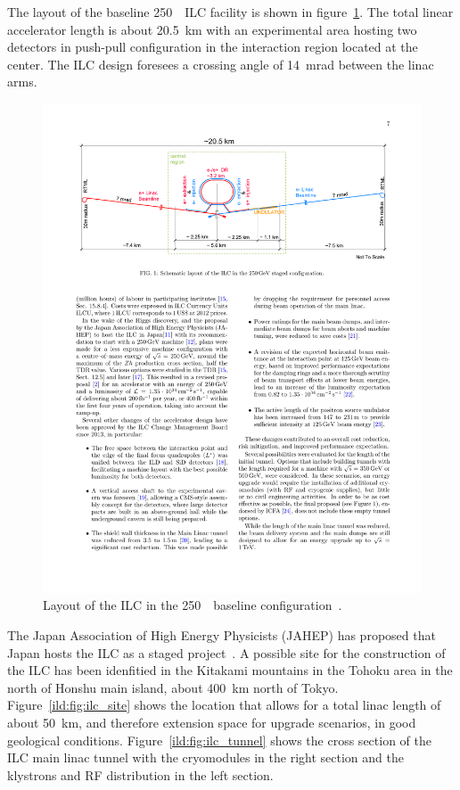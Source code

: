The layout of the baseline 250~\GeV~ILC facility is shown in figure~\ref{ild:fig:ilc_footprint}. The total linear accelerator length is about 20.5~km with an experimental area hosting two detectors in push-pull configuration in the interaction region located at the center. The ILC design foresees a crossing angle of 14~mrad between the linac arms.
\begin{figure}[!ht]
\centering
\includegraphics[width=0.9\hsize]{ILC/figs/ILC_Footprint.pdf}

\caption{\label{ild:fig:ilc_footprint}Layout of the ILC in the 250~\GeV~baseline configuration~\cite{Bambade:2019fyw}.}
\end{figure}
The Japan Association of High Energy Physicists (JAHEP) has proposed that Japan hosts the ILC as a staged project~\cite{ild:bib:JAHEP}. A possible site for the construction of the ILC has been idenfitied in the Kitakami mountains in the Tohoku area in the north of Honshu main island, about 400~km north of Tokyo. Figure~\ref{ild:fig:ilc_site} shows the location that allows for a total linac length of about 50~km, and therefore extension space for upgrade scenarios, in good geological conditions. Figure~\ref{ild:fig:ilc_tunnel} shows the cross section of the ILC main linac tunnel with the cryomodules in the right section and the klystrons and RF distribution in the left section.
